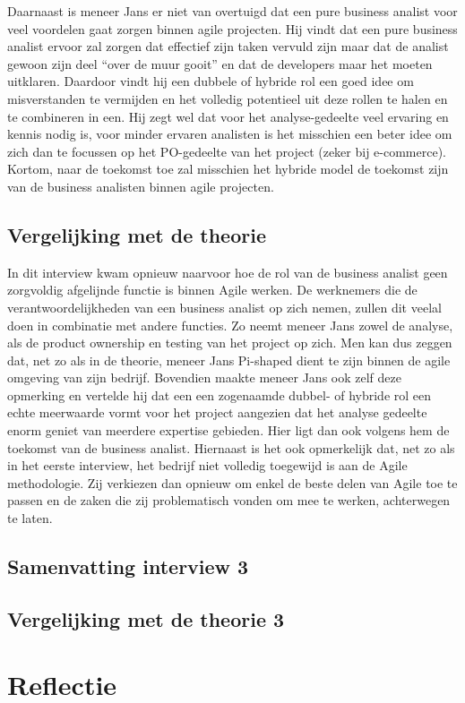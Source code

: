 \documentclass{hogent-article}
\begin{document}
Daarnaast is meneer Jans er niet van overtuigd dat een pure business analist voor veel voordelen gaat zorgen binnen agile projecten. Hij vindt dat een pure business analist ervoor zal zorgen dat effectief zijn taken vervuld zijn maar dat de analist gewoon zijn deel “over de muur gooit” en dat de developers maar het moeten uitklaren. Daardoor vindt hij een dubbele of hybride rol een goed idee om misverstanden te vermijden en het volledig potentieel uit deze rollen te halen en te combineren in een. Hij zegt wel dat voor het analyse-gedeelte veel ervaring en kennis nodig is, voor minder ervaren analisten is het misschien een beter idee om zich dan te focussen op het PO-gedeelte van het project (zeker bij e-commerce). Kortom, naar de toekomst toe zal misschien het hybride model de toekomst zijn van de business analisten binnen agile projecten.


\subsection{Vergelijking met de theorie}

In dit interview kwam opnieuw naarvoor hoe de rol van de business analist geen zorgvoldig afgelijnde functie is binnen Agile werken. De werknemers die de verantwoordelijkheden van een business analist op zich nemen, zullen dit veelal doen in combinatie met andere functies. Zo neemt meneer Jans zowel de analyse, als de product ownership en testing van het project op zich.  Men kan dus zeggen dat, net zo als in de theorie, meneer Jans Pi-shaped dient te zijn binnen de agile omgeving van zijn bedrijf. Bovendien maakte meneer Jans ook zelf deze opmerking en vertelde hij dat een een zogenaamde dubbel- of hybride rol een echte meerwaarde vormt voor het project aangezien dat het analyse gedeelte enorm geniet van meerdere expertise gebieden. Hier ligt dan ook volgens hem de toekomst van de business analist. Hiernaast is het ook opmerkelijk dat, net zo als in het eerste interview, het bedrijf niet volledig toegewijd is aan de Agile methodologie. Zij verkiezen dan opnieuw om enkel de beste delen van Agile toe te passen en de zaken die zij problematisch vonden om mee te werken, achterwegen te laten. 

\subsection{ Samenvatting interview 3}


\subsection{Vergelijking met de theorie 3}

\section{Reflectie}


\printbibliography[heading=bibintoc]
\end{document}

